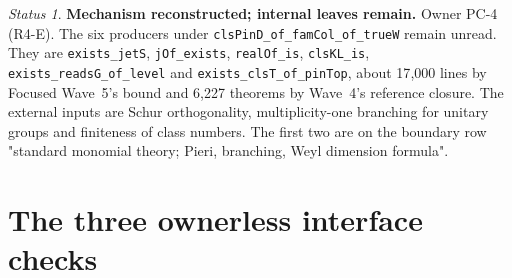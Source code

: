 \documentclass[11pt]{article}
\newcommand{\lean}[1]{\nolinkurl{#1}}
\newcommand{\PC}[1]{PC-#1}
\theoremstyle{remark}
\newtheorem*{status}{Status}
\begin{document}
\begin{status}
\textbf{Mechanism reconstructed; internal leaves remain.} Owner \PC{4} (R4-E). The six producers under \lean{clsPinD_of_famCol_of_trueW} remain unread. They are \lean{exists_jetS}, \lean{jOf_exists}, \lean{realOf_is}, \lean{clsKL_is}, \lean{exists_readsG_of_level} and \lean{exists_clsT_of_pinTop}, about 17{,}000 lines by Focused Wave~5's bound and 6{,}227 theorems by Wave~4's reference closure. The external inputs are Schur orthogonality, multiplicity-one branching for unitary groups and finiteness of class numbers. The first two are on the boundary row "standard monomial theory; Pieri, branching, Weyl dimension formula".
\end{status}

\section{The three ownerless interface checks}\label{sec:IF}
\end{document}
